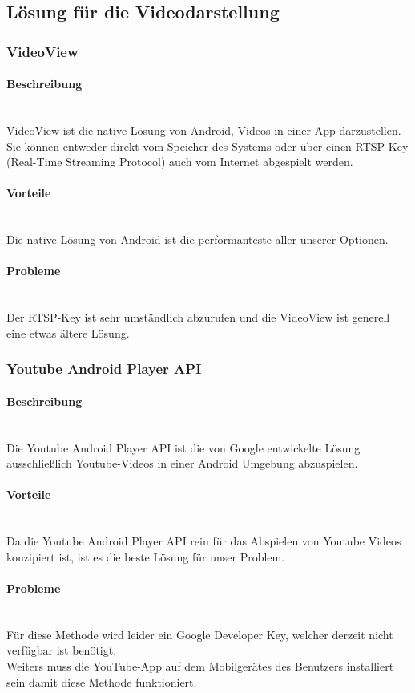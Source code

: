 \documentclass[FIPLY_base.tex]{subfiles}
\begin{document}
\subsection{Lösung für die Videodarstellung}
\subsubsection{VideoView}
\paragraph{Beschreibung}\ \\
VideoView ist die native Lösung von Android, Videos in einer App darzustellen. Sie können entweder direkt vom Speicher des Systems oder über einen RTSP-Key (Real-Time Streaming Protocol) auch vom Internet  abgespielt werden.
\paragraph{Vorteile}\ \\
Die native Lösung von Android ist die performanteste aller unserer Optionen.
\paragraph{Probleme}\ \\
Der RTSP-Key ist sehr umständlich abzurufen und die VideoView ist generell eine etwas ältere Lösung.

\subsubsection{Youtube Android Player API}
\paragraph{Beschreibung}\ \\
Die Youtube Android Player API ist die von Google entwickelte Lösung ausschließlich Youtube-Videos in einer Android Umgebung abzuspielen.
\paragraph{Vorteile}\ \\
Da die Youtube Android Player API rein für das Abspielen von Youtube Videos konzipiert ist, ist es die beste Lösung für unser Problem.
\paragraph{Probleme}\ \\
Für diese Methode wird leider ein Google Developer Key, welcher derzeit nicht verfügbar ist benötigt.\ \\
Weiters muss die YouTube-App auf dem Mobilgerätes des Benutzers installiert sein damit diese Methode funktioniert.
\newpage
\end{document}
